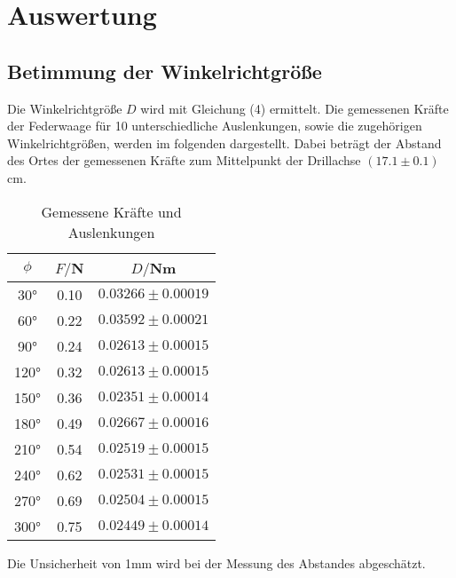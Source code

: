 \section{Auswertung}
\label{sec:Auswertung}
\subsection{Betimmung der Winkelrichtgröße}
Die Winkelrichtgröße $D$ wird mit Gleichung (4) ermittelt.
Die gemessenen Kräfte der Federwaage für 10 unterschiedliche Auslenkungen, sowie
die zugehörigen Winkelrichtgrößen, werden im folgenden dargestellt. Dabei beträgt
der Abstand des Ortes der gemessenen Kräfte zum Mittelpunkt der Drillachse
$(17.1 \pm 0.1)$cm.

\begin{table}[H]
  \centering
  \caption{Gemessene Kräfte und Auslenkungen}
  \label{tab:Parameter}
  \begin{tabular}{c c c}
    \toprule
    $\phi$ & $F/$N & $D/$Nm \\
    \bottomrule
     30° & 0.10  & $0.03266 \pm 0.00019$ \\
     60° & 0.22  & $0.03592 \pm 0.00021$ \\
     90° & 0.24  & $0.02613 \pm 0.00015$ \\
    120° & 0.32  & $0.02613 \pm 0.00015$ \\
    150° & 0.36  & $0.02351 \pm 0.00014$ \\
    180° & 0.49  & $0.02667 \pm 0.00016$ \\
    210° & 0.54  & $0.02519 \pm 0.00015$ \\
    240° & 0.62  & $0.02531 \pm 0.00015$ \\
    270° & 0.69  & $0.02504 \pm 0.00015$ \\
    300° & 0.75  & $0.02449 \pm 0.00014$ \\
    \bottomrule
  \end{tabular}
\end{table}

Die Unsicherheit von 1mm wird bei der Messung des Abstandes
abgeschätzt.

